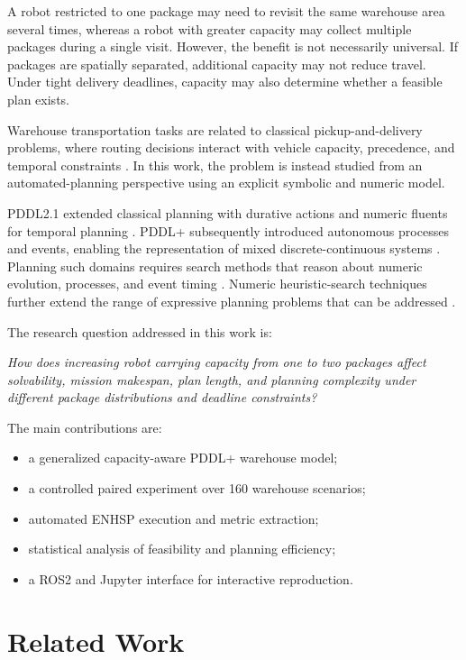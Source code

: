 \documentclass[conference]{IEEEtran}
\begin{document}
A robot restricted to one package may need to revisit the same warehouse area
several times, whereas a robot with greater capacity may collect multiple
packages during a single visit. However, the benefit is not necessarily
universal. If packages are spatially separated, additional capacity may not
reduce travel. Under tight delivery deadlines, capacity may also determine
whether a feasible plan exists.

Warehouse transportation tasks are related to classical pickup-and-delivery
problems, where routing decisions interact with vehicle capacity, precedence,
and temporal constraints \cite{dumas1991,savelsbergh1995}. In this work, the
problem is instead studied from an automated-planning perspective using an
explicit symbolic and numeric model.

PDDL2.1 extended classical planning with durative actions and numeric fluents
for temporal planning \cite{fox2003}. PDDL+ subsequently introduced autonomous
processes and events, enabling the representation of mixed
discrete-continuous systems \cite{fox2006}. Planning such domains requires
search methods that reason about numeric evolution, processes, and event
timing \cite{coles2014,piotrowski2016}. Numeric heuristic-search techniques
further extend the range of expressive planning problems that can be addressed
\cite{scala2016subgoal,scala2016interval,scala2020}.

The research question addressed in this work is:

\emph{How does increasing robot carrying capacity from one to two packages
affect solvability, mission makespan, plan length, and planning complexity
under different package distributions and deadline constraints?}

The main contributions are:
\begin{itemize}
    \item a generalized capacity-aware PDDL+ warehouse model;
    \item a controlled paired experiment over 160 warehouse scenarios;
    \item automated ENHSP execution and metric extraction;
    \item statistical analysis of feasibility and planning efficiency;
    \item a ROS2 and Jupyter interface for interactive reproduction.
\end{itemize}

\section{Related Work}
\end{document}
